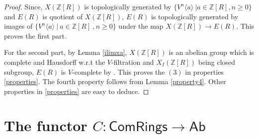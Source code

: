 \documentclass[10pt]{amsart}
\theoremstyle{plain}
\theoremstyle{definition}
\newcommand{\Z}{{\mathbb Z}}
\newcommand{\ab}[1]{\langle {#1} \rangle}
\newcommand{\Com}{{\mathsf{ComRings}}}
\begin{document}
\begin{proof}
Since, $X(\Z[R])$ is topologically generated by $\{V^n\ab{a} \ | a\in \Z[R], n\geq 0\}$ and $E(R)$ is quotient of $X(\Z[R])$, $E(R)$ is topologically generated by images of $\{V^n\ab{a} \ | \ a \in \Z[R] \ ,n\geq 0\}$ under the map $X(\Z[R]) \to  E(R)$. This proves the first part.
    
\noindent For the second part, by Lemma \ref{ilimxa}, $X(\Z[R])$ is an abelian group which is complete and Hausdorff w.r.t the $V$-filtration and  $X_I(\Z[R])$ being closed subgroup, $E(R)$ is $V$-complete by \cite[chap IX, §3.1, prop. 4]{bour}. This proves the $(3)$ in properties \ref{properties}. The fourth property follows from Lemma \ref{property4}. Other properties in \ref{properties} are easy to deduce.
\end{proof}
\vspace{2mm}

\section{The functor $C: \Com \to \mathsf{Ab}$}
\end{document}

